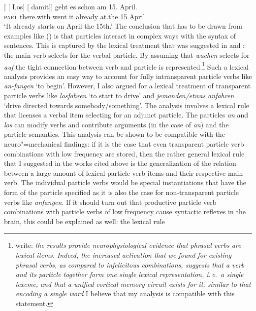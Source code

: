 \begin{exe}
\begin{xlist}[iv.]
\begin{exe}
\begin{xlist}[iv.]
\ex
\gll {}[ [ Los]        [ damit]]    geht es schon   am 15. April.\footnotemark\\
       {}        {}        \textsc{part}  {}        there.with went it already at.the 15 April\\%
%
\glt `It already starts on April the 15th.'
\zl
The conclusion that has to be drawn from examples like () is that particles interact in
complex ways with the syntax of sentences. This is captured by the lexical treatment that was
suggested in  and : the main verb selects for the verbal
particle. By assuming that \emph{wachen} selects for \emph{auf} the tight connection between verb
and particle is represented.\footnote{
\citet[]{CSP2010a} write: \emph{the results provide neurophysiological evidence that
  phrasal verbs are lexical items. Indeed, the increased activation that we found for existing
  phrasal verbs, as compared to infelicitous combinations, suggests that a verb and its particle
  together form one single lexical representation, i.\,e.\ a single lexeme, and that a unified
  cortical memory circuit exists for it, similar to that encoding a single word} I believe that
  my analysis is compatible with this statement.
} Such a lexical analysis provides an easy way to account for fully
intransparent particle verbs like \emph{an-fangen} `to begin'. However, I also argued for a
lexical treatment of transparent particle verbs like \emph{losfahren} `to start to drive' and
\emph{jemanden/etwas anfahren} `drive directed towards somebody/something'. The
analysis involves a lexical rule that licenses a verbal item selecting for an adjunct
particle. The particles \emph{an} and \emph{los} can modify verbs and contribute arguments (in the
case of \emph{an}) and the particle semantics. This analysis can be shown to be compatible with the
neuro"=mechanical findings: if it is the case that even transparent particle verb combinations with
low frequency are stored, then the rather general lexical rule that I suggested in the works cited above is the
generalization of the relation between a large amount of lexical particle verb items and their respective main
verb. The individual particle verbs would be special instantiations that have the form of the
particle specified as it is also the case for non-transparent particle verbs like \emph{anfangen}.
If it should turn out that productive particle verb combinations with particle verbs of low
frequency cause syntactic reflexes in the brain, this could be explained as well: the lexical rule

\end{xlist}
\end{exe}
\end{xlist}
\end{exe}
